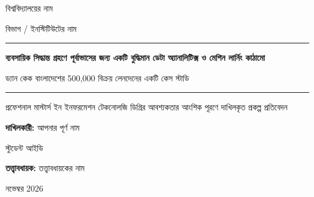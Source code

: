 \documentclass[12pt,a4paper,oneside]{report}
\newcommand{\StudentName}{আপনার পূর্ণ নাম}
\newcommand{\StudentID}{স্টুডেন্ট আইডি}
\newcommand{\Supervisor}{তত্ত্বাবধায়কের নাম}
\newcommand{\Programme}{প্রফেশনাল মাস্টার্স ইন ইনফরমেশন টেকনোলজি}
\newcommand{\Department}{বিভাগ / ইনস্টিটিউটের নাম}
\newcommand{\University}{বিশ্ববিদ্যালয়ের নাম}
\newcommand{\SubmissionDate}{নভেম্বর 2026}
\newcommand{\ProjectTitle}{ব্যবসায়িক সিদ্ধান্ত গ্রহণে পূর্বাভাসের জন্য একটি বুদ্ধিমান ডেটা অ্যানালিটিক্স ও মেশিন লার্নিং কাঠামো}
\newcommand{\ProjectSubtitle}{ড্যান কেক বাংলাদেশের 500,000 বিক্রয় লেনদেনের একটি কেস স্টাডি}
\begin{document}
\begin{titlepage}
\centering
{\large \University\par}\vspace{2mm}
{\normalsize \Department\par}
\vspace{2cm}
{\color{brand}\rule{\linewidth}{1.2pt}\par}\vspace{6mm}
{\LARGE\bfseries\color{brand} \ProjectTitle\par}\vspace{5mm}
{\Large \ProjectSubtitle\par}\vspace{4mm}
{\color{brand}\rule{\linewidth}{1.2pt}\par}
\vspace{1.8cm}
{\large \Programme{} ডিগ্রির আবশ্যকতার আংশিক পূরণে দাখিলকৃত প্রকল্প প্রতিবেদন\par}
\vspace{2cm}
{\large \textbf{দাখিলকারী:} \StudentName\par \StudentID\par}\vspace{6mm}
{\large \textbf{তত্ত্বাবধায়ক:} \Supervisor\par}
\vfill
{\large \SubmissionDate\par}
\end{titlepage}



\tableofcontents
\listoffigures
\listoftables

\cleardoublepage
{}














\appendix

\end{document}
